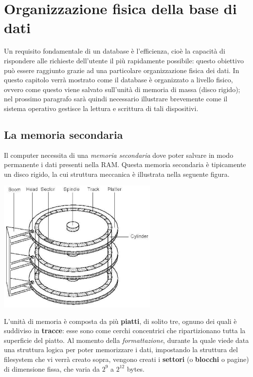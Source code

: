 \section{Organizzazione fisica della base di dati}

Un requisito fondamentale di un database è l'efficienza, cioè la capacità di rispondere alle 
richieste dell'utente il più rapidamente possibile: questo obiettivo può essere raggiunto grazie
ad una particolare organizzazione fisica dei dati. In questo capitolo verrà mostrato come il database
è organizzato a livello fisico, ovvero come questo viene salvato sull'unità di memoria 
di massa (disco rigido); nel prossimo paragrafo sarà quindi necessario illustrare brevemente come il
sistema operativo gestisce la lettura e scrittura di tali dispositivi.

\subsection{La memoria secondaria}
Il computer necessita di una \emph{memoria secondaria} dove poter salvare in modo permanente
i dati presenti nella RAM. Questa memoria secondaria è tipicamente un disco rigido, la cui struttura
meccanica è illustrata nella seguente figura.
\begin{center}
 \includegraphics[width=300px]{img_5_1.eps}
\end{center}
L'unità di memoria è composta da più \textbf{piatti}, di solito tre, ognuno dei quali è suddiviso
in \textbf{tracce}: esse sono come cerchi concentrici che ripartizionano tutta la superficie del
piatto. Al momento della \emph{formattazione}, durante la quale viede data una struttura logica per 
poter memorizzare i dati, impostando la struttura del filesystem che vi verrà creato sopra, vengono
creati i \textbf{settori} (o \textbf{blocchi} o pagine) di dimensione fissa, che varia da $2^9$ a $2^{12}$
bytes.\\
